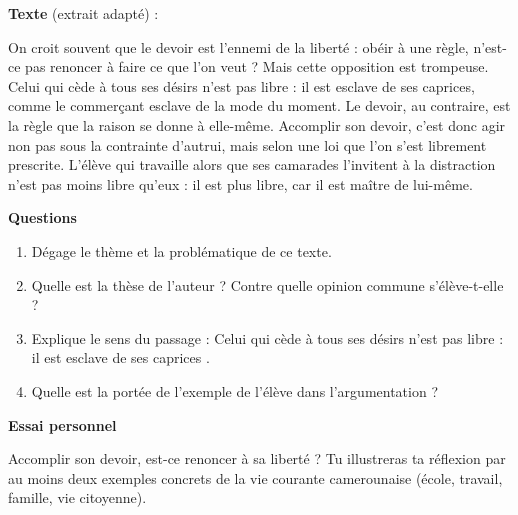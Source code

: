 \documentclass[11pt]{article}
\begin{document}
\begin{exercice}
\textbf{Texte} (extrait adapté) :

\og On croit souvent que le devoir est l'ennemi de la liberté : obéir à une règle, n'est-ce pas renoncer à faire ce que l'on veut ? Mais cette opposition est trompeuse. Celui qui cède à tous ses désirs n'est pas libre : il est esclave de ses caprices, comme le commerçant esclave de la mode du moment. Le devoir, au contraire, est la règle que la raison se donne à elle-même. Accomplir son devoir, c'est donc agir non pas sous la contrainte d'autrui, mais selon une loi que l'on s'est librement prescrite. L'élève qui travaille alors que ses camarades l'invitent à la distraction n'est pas moins libre qu'eux : il est plus libre, car il est maître de lui-même. \fg

\textbf{Questions}
\begin{enumerate}
\item Dégage le thème et la problématique de ce texte.
\item Quelle est la thèse de l'auteur ? Contre quelle opinion commune s'élève-t-elle ?
\item Explique le sens du passage : \og Celui qui cède à tous ses désirs n'est pas libre : il est esclave de ses caprices \fg.
\item Quelle est la portée de l'exemple de l'élève dans l'argumentation ?
\end{enumerate}

\textbf{Essai personnel}

Accomplir son devoir, est-ce renoncer à sa liberté ? Tu illustreras ta réflexion par au moins deux exemples concrets de la vie courante camerounaise (école, travail, famille, vie citoyenne).
\end{exercice}
\end{document}
